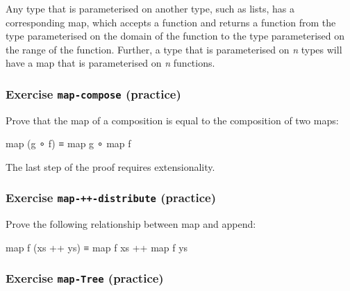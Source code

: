 Any type that is parameterised on another type, such as lists, has a
corresponding map, which accepts a function and returns a function from
the type parameterised on the domain of the function to the type
parameterised on the range of the function. Further, a type that is
parameterised on \emph{n} types will have a map that is parameterised on
\emph{n} functions.

\hypertarget{exercise-map-compose-practice}{%
\subsubsection{\texorpdfstring{Exercise \texttt{map-compose}
(practice)}{Exercise map-compose (practice)}}\label{exercise-map-compose-practice}}

Prove that the map of a composition is equal to the composition of two
maps:

\begin{myDisplay}
map (g ∘ f) ≡ map g ∘ map f
\end{myDisplay}

The last step of the proof requires extensionality.

\begin{fence}
\begin{code}%
\>[0]\<%
\end{code}
\end{fence}

\hypertarget{exercise-map--distribute-practice}{%
\subsubsection{\texorpdfstring{Exercise \texttt{map-++-distribute}
(practice)}{Exercise map-++-distribute (practice)}}\label{exercise-map--distribute-practice}}

Prove the following relationship between map and append:

\begin{myDisplay}
map f (xs ++ ys) ≡ map f xs ++ map f ys
\end{myDisplay}

\begin{fence}
\begin{code}%
\>[0]\<%
\end{code}
\end{fence}

\hypertarget{exercise-map-tree-practice}{%
\subsubsection{\texorpdfstring{Exercise \texttt{map-Tree}
(practice)}{Exercise map-Tree (practice)}}\label{exercise-map-tree-practice}}

